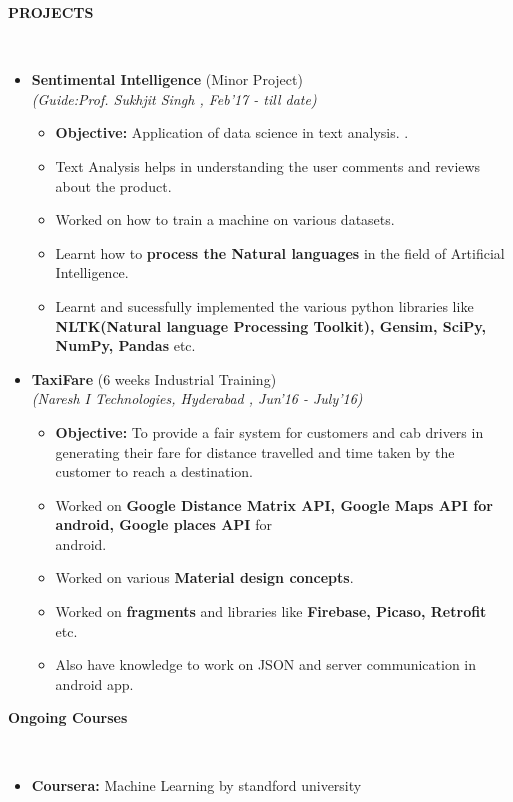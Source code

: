 \documentclass[a4paper,10pt]{article}
\newcommand{\isep}{-2 pt}
\newcommand{\lsep}{-0.5cm}
\newcommand{\resheading}[1]{{\small \colorbox{mygrey}{\begin{minipage}{0.975\textwidth}{\textbf{#1 \vphantom{p\^{E}}}}\end{minipage}}}}
\begin{document}
\resheading{\textbf{PROJECTS} }\\[\lsep]
\begin{itemize}
\item \textbf{\Large Sentimental Intelligence
} (Minor Project) \\
 \emph{(Guide:Prof. Sukhjit Singh
, Feb'17 - till date)} \\[-0.6cm]
	\begin{itemize}\itemsep \isep
	\item \textbf{Objective:} Application of data science in text analysis.
.
	\item Text Analysis helps in understanding the user comments and reviews about the product.
    \item Worked on how to train a machine on various datasets.
    \item Learnt how to \textbf{process the Natural languages} in the field of Artificial Intelligence.
	\item Learnt and sucessfully implemented the various python libraries like \textbf{NLTK(Natural language Processing Toolkit), Gensim, SciPy, NumPy, Pandas} etc.

	\end{itemize}

\item \textbf{\Large TaxiFare
} (6 weeks Industrial Training) \\
 \emph{(Naresh I Technologies, Hyderabad
, Jun'16 - July'16)} \\[-0.6cm]
	\begin{itemize}\itemsep \isep
	\item \textbf{Objective:} To provide a fair system for customers and cab drivers in generating their fare for distance travelled and time taken by the customer to reach a destination. 
	\item Worked on \textbf{Google Distance Matrix API, Google Maps API for android, Google places API} for \\android.
	\item Worked on various \textbf{Material design concepts}.
	\item Worked on \textbf{fragments} and libraries like \textbf{Firebase, Picaso, Retrofit} etc.
	\item Also have knowledge to work on JSON and server communication in android app.
	\end{itemize}
\end{itemize}

\resheading{\textbf{Ongoing Courses} }\\[\lsep]
\begin{itemize}
	\item \textbf{\small Coursera:} Machine Learning by standford university  
\end{itemize}
\end{document}
